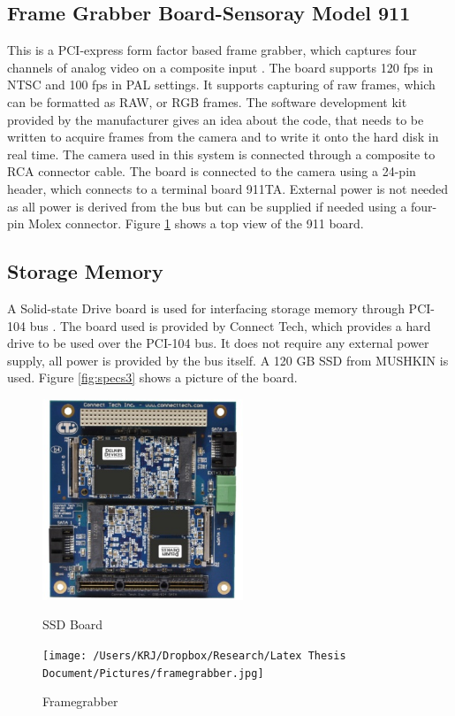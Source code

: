 \subsection{Frame Grabber Board-Sensoray Model 911}

This is a PCI-express form factor based frame grabber, which captures four channels of analog video on a composite input \cite{Sensoray}. The board supports 120 fps in NTSC and 100 fps in PAL settings. It supports capturing of raw frames, which can be formatted as RAW, or RGB frames. The software development kit provided by the manufacturer gives an idea about the code, that needs to be written to acquire frames from the camera and to write it onto the hard disk in real time. The camera used in this system is connected through a composite to RCA connector cable. The board is connected to the camera using a 24-pin header, which connects to a terminal board 911TA. External power is not needed as all power is derived from the bus but can be supplied if needed using a four-pin Molex connector. Figure \ref{fig:specs2} shows a top view of the 911 board. 


\subsection{Storage Memory}
A Solid-state Drive board is used for interfacing storage memory through PCI-104 bus . The board used is provided by Connect Tech, which provides a hard drive to be used over the PCI-104 bus. It does not require any external power supply, all power is provided by the bus itself. A 120 GB SSD from MUSHKIN is used. Figure \ref{fig:specs3} shows a picture of the board.


\begin{figure}[ht]
\begin{minipage}[b]{0.45\linewidth}
    \centering
    \includegraphics[width=6cm,height=6cm,keepaspectratio]{Pictures/ssd.jpg}
    \caption{SSD Board}
    \label{fig:specs3}
\end{minipage}
\begin{minipage}[b]{0.45\linewidth}
    \centering
    \texttt{[image: /Users/KRJ/Dropbox/Research/Latex Thesis Document/Pictures/framegrabber.jpg]}
    \caption{Framegrabber}
    \label{fig:specs2}
\end{minipage}
\end{figure}

